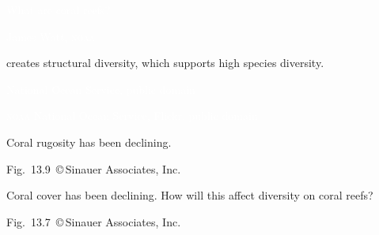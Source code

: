 \documentclass[t,handout]{beamer}  %
\begin{document}


{
\begin{frame}[b]{\hfill\textcolor{white}{What are coral reefs?}}

\hfill \tiny \textcolor{white}{James Watt, \textsc{noaa}}
\end{frame}
}

%
{
\begin{frame}[b]{ creates structural diversity, which supports high species diversity.}

\hfill \tiny \textcolor{white}{National Ocean Service, public domain}
\end{frame}
}
%
{
\begin{frame}[b]

\hfill \tiny \textcolor{white}{\textsc{noaa} National Ocean Service, Flickr, public domain}
\end{frame}
}

%
{
\begin{frame}[b]{Coral rugosity has been declining.}

	\hfill \tiny Fig.~13.9~\copyright\,Sinauer Associates, Inc.

\end{frame}
}

%
{
\begin{frame}[b]{Coral cover has been declining. How will this affect diversity on coral reefs?}

	\hfill \tiny Fig.~13.7~\copyright\,Sinauer Associates, Inc.

\end{frame}
}
\end{document}
